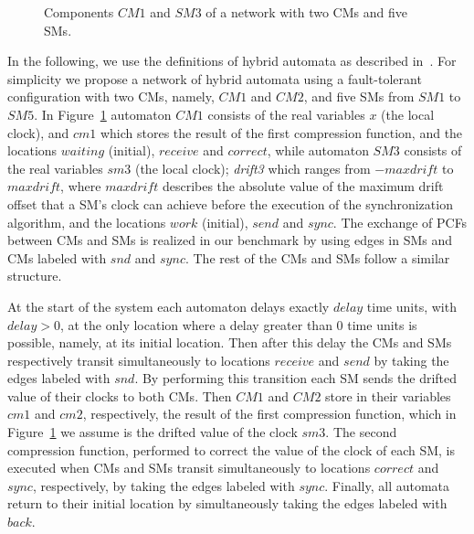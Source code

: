 \begin{figure}[t]

\vspace*{-1em}
\caption{Components $\mathit{CM1}$ and $\mathit{SM3}$ of a network with two CMs and five SMs.}
\label{fig1}
\end{figure}%

In the following, we use the definitions of hybrid automata as described in~\cite{Herrera3}.
For simplicity we propose a network of hybrid automata using a fault-tolerant configuration
with two CMs, namely, $\mathit{CM1}$ and $\mathit{CM2}$, 
and five SMs from $\mathit{SM1}$ to $\mathit{SM5}$. 
In Figure~\ref{fig1} automaton $\mathit{CM1}$ consists of the 
real variables $x$ (the local clock), and $\mathit{cm1}$ which stores the result of the first compression function, and 
the locations $\mathit{waiting}$ (initial), $\mathit{receive}$ and $\mathit{correct}$, while 
automaton $\mathit{SM3}$ consists of the real variables $\mathit{sm3}$ (the local clock);  \emph{drift3}  which ranges from 
$-\mathit{maxdrift}$ to $\mathit{maxdrift}$, where $\mathit{maxdrift}$ describes the absolute value of the maximum 
drift offset that a SM's clock can achieve before the execution of the synchronization algorithm, 
and the locations $\mathit{work}$ (initial), $\mathit{send}$ 
and $\mathit{sync}$. The exchange of PCFs between CMs and SMs is realized in our benchmark
by using edges in SMs and CMs labeled with $\mathit{snd}$ and $\mathit{sync}$. 
The rest of the CMs and SMs follow a similar structure.

At the start of the system each automaton delays exactly $\mathit{delay}$ time units, 
with $\mathit{delay}>0$, at the only location where a delay greater than 0 time units is possible, namely, at 
its initial location. Then after this delay 
the CMs and SMs respectively transit simultaneously to locations $\mathit{receive}$ and 
$\mathit{send}$ by taking the edges labeled with $\mathit{snd}$.
By performing this transition each SM sends the drifted value of their clocks to both CMs. 
Then $\mathit{CM1}$ and $\mathit{CM2}$ store in their variables $\mathit{cm1}$
and $\mathit{cm2}$, respectively, the result of the first compression function, which in Figure~\ref{fig1}
we assume is the drifted value of the clock $\mathit{sm3}$. 
The second compression function, performed to correct the value of the clock of each SM, 
is executed when CMs and SMs transit simultaneously to locations
$\mathit{correct}$ and $\mathit{sync}$, respectively, by taking the edges labeled with $\mathit{sync}$.
Finally, all automata return to their initial location by simultaneously taking the 
edges labeled with $\mathit{back}$.

